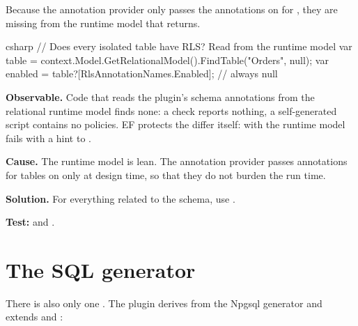 Because the annotation provider only passes the annotations on for ,
they are missing from the runtime model that  returns.

\begin{sourcecode}{csharp}
// Does every isolated table have RLS? Read from the runtime model
var table = context.Model.GetRelationalModel().FindTable("Orders", null);
var enabled = table?[RlsAnnotationNames.Enabled];          // always null
\end{sourcecode}

\begin{failure}
  \textbf{Observable.} Code that reads the plugin's schema annotations from the relational
  runtime model finds none: a check reports nothing, a self-generated script contains no
  policies. EF protects the differ itself:  with the
  runtime model fails with a hint to .

  \textbf{Cause.} The runtime model is lean. The annotation provider passes annotations for
  tables on only at design time, so that they do not burden the run time.

  \textbf{Solution.} For everything related to the schema, use
  .

  \textbf{Test:}
  and .
\end{failure}

\section{The SQL generator}

There is also only one . The plugin
derives from the Npgsql generator and extends  and
:

